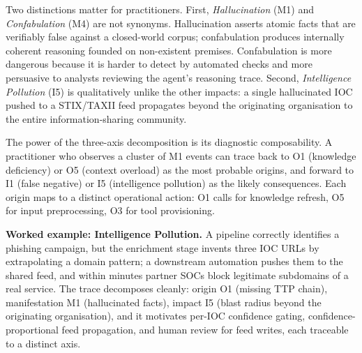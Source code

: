 Two distinctions matter for practitioners. First, \textit{Hallucination}
(M1) and \textit{Confabulation} (M4) are not synonyms. Hallucination
asserts atomic facts that are verifiably false against a closed-world
corpus; confabulation produces internally coherent reasoning founded
on non-existent premises. Confabulation is more dangerous because it
is harder to detect by automated checks and more persuasive to
analysts reviewing the agent's reasoning trace. Second,
\textit{Intelligence Pollution} (I5) is qualitatively unlike the other
impacts: a single hallucinated IOC pushed to a STIX/TAXII feed
propagates beyond the originating organisation to the entire
information-sharing community.

The power of the three-axis decomposition is its diagnostic
composability. A practitioner who observes a cluster of M1 events can
trace back to O1 (knowledge deficiency) or O5 (context overload) as
the most probable origins, and forward to I1 (false negative) or I5
(intelligence pollution) as the likely consequences. Each origin maps
to a distinct operational action: O1 calls for knowledge refresh, O5
for input preprocessing, O3 for tool provisioning.

\textbf{Worked example: Intelligence Pollution.}
A pipeline correctly identifies a phishing campaign, but the enrichment
stage invents three IOC URLs by extrapolating a domain pattern; a
downstream automation pushes them to the shared feed, and within minutes
partner SOCs block legitimate subdomains of a real service. The trace
decomposes cleanly: origin O1 (missing TTP chain), manifestation M1
(hallucinated facts), impact I5 (blast radius beyond the originating
organisation), and it motivates per-IOC confidence gating,
confidence-proportional feed propagation, and human review for feed
writes, each traceable to a distinct axis.

